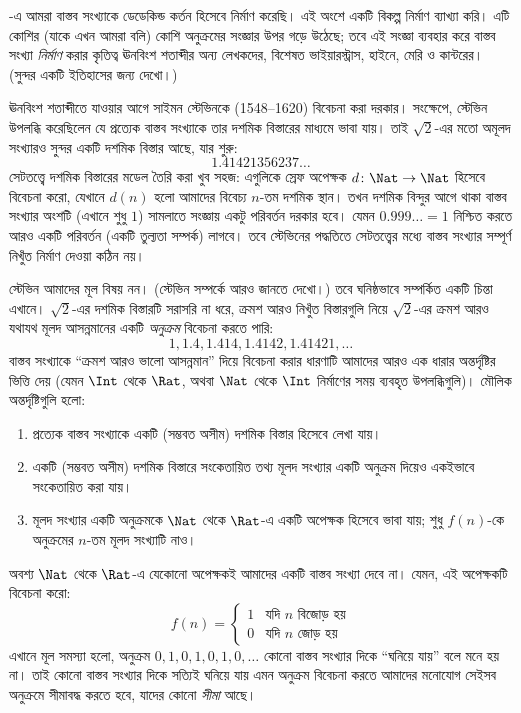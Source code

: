 \documentclass[../../../include/open-logic-section]{subfiles}
\begin{document}


-এ আমরা বাস্তব সংখ্যাকে ডেডেকিন্ড কর্তন হিসেবে নির্মাণ করেছি। এই অংশে একটি বিকল্প নির্মাণ ব্যাখ্যা করি। এটি কোশির (যাকে এখন আমরা বলি) কোশি অনুক্রমের সংজ্ঞার উপর গড়ে উঠেছে; তবে এই সংজ্ঞা ব্যবহার করে বাস্তব সংখ্যা \emph{নির্মাণ} করার কৃতিত্ব ঊনবিংশ শতাব্দীর অন্য লেখকদের, বিশেষত ভাইয়ারস্ট্রাস, হাইনে, মেরি ও কান্টরের। (সুন্দর একটি ইতিহাসের জন্য \citeauthor{OConnorRobertson:RN}
\citeyear{OConnorRobertson:RN} দেখো।)

ঊনবিংশ শতাব্দীতে যাওয়ার আগে সাইমন স্টেভিনকে (1548--1620) বিবেচনা করা দরকার। সংক্ষেপে, স্টেভিন উপলব্ধি করেছিলেন যে প্রত্যেক বাস্তব সংখ্যাকে তার দশমিক বিস্তারের মাধ্যমে ভাবা যায়। তাই $\sqrt{2}$-এর মতো অমূলদ সংখ্যারও সুন্দর একটি দশমিক বিস্তার আছে, যার শুরু:
\[
	1.41421356237\ldots
\]
সেটতত্ত্বে দশমিক বিস্তারের মডেল তৈরি করা খুব সহজ: এগুলিকে স্রেফ অপেক্ষক $d \colon \Nat \to \Nat$ হিসেবে বিবেচনা করো, যেখানে $d(n)$ হলো আমাদের বিবেচ্য $n$-তম দশমিক স্থান। তখন দশমিক বিন্দুর আগে থাকা বাস্তব সংখ্যার অংশটি (এখানে শুধু $1$) সামলাতে সংজ্ঞায় একটু পরিবর্তন দরকার হবে। যেমন $0.999\ldots
= 1$ নিশ্চিত করতে আরও একটি পরিবর্তন (একটি তুল্যতা সম্পর্ক) লাগবে। তবে স্টেভিনের পদ্ধতিতে সেটতত্ত্বের মধ্যে বাস্তব সংখ্যার সম্পূর্ণ নিখুঁত নির্মাণ দেওয়া কঠিন নয়।

স্টেভিন আমাদের মূল বিষয় নন। (স্টেভিন সম্পর্কে আরও জানতে \citealt{KatzKatz2012} দেখো।) তবে ঘনিষ্ঠভাবে সম্পর্কিত একটি চিন্তা এখানে। $\sqrt{2}$-এর দশমিক বিস্তারটি সরাসরি না ধরে, ক্রমশ আরও নিখুঁত বিস্তারগুলি নিয়ে $\sqrt{2}$-এর ক্রমশ আরও যথাযথ মূলদ আসন্নমানের একটি \emph{অনুক্রম} বিবেচনা করতে পারি:
\[
1, 1.4, 1.414, 1.4142, 1.41421,\ldots
\]
বাস্তব সংখ্যাকে ``ক্রমশ আরও ভালো আসন্নমান'' দিয়ে বিবেচনা করার ধারণাটি আমাদের আরও এক ধারার অন্তর্দৃষ্টির ভিত্তি দেয় (যেমন $\Int$ থেকে $\Rat$, অথবা $\Nat$ থেকে $\Int$ নির্মাণের সময় ব্যবহৃত উপলব্ধিগুলি)। মৌলিক অন্তর্দৃষ্টিগুলি হলো:
\begin{enumerate}
	\item প্রত্যেক বাস্তব সংখ্যাকে একটি (সম্ভবত অসীম) দশমিক বিস্তার হিসেবে লেখা যায়।
	\item একটি (সম্ভবত অসীম) দশমিক বিস্তারে সংকেতায়িত তথ্য মূলদ সংখ্যার একটি অনুক্রম দিয়েও একইভাবে সংকেতায়িত করা যায়।
	\item মূলদ সংখ্যার একটি অনুক্রমকে $\Nat$ থেকে $\Rat$-এ একটি অপেক্ষক হিসেবে ভাবা যায়; শুধু $f(n)$-কে অনুক্রমের $n$-তম মূলদ সংখ্যাটি নাও।
\end{enumerate}
অবশ্য $\Nat$ থেকে $\Rat$-এ যেকোনো অপেক্ষকই আমাদের একটি বাস্তব সংখ্যা দেবে না। যেমন, এই অপেক্ষকটি বিবেচনা করো:
\[
	f(n) =\begin{cases}
			1 & \text{যদি }n\text{ বিজোড় হয়}\\
			0 &\text{যদি }n\text{ জোড় হয়}
		\end{cases}
\]
এখানে মূল সমস্যা হলো, অনুক্রম $0,1,0,1,0,1,0,\ldots$ কোনো বাস্তব সংখ্যার দিকে ``ঘনিয়ে যায়'' বলে মনে হয় না। তাই কোনো বাস্তব সংখ্যার দিকে সত্যিই ঘনিয়ে যায় এমন অনুক্রম বিবেচনা করতে আমাদের মনোযোগ সেইসব অনুক্রমে সীমাবদ্ধ করতে হবে, যাদের কোনো \emph{সীমা} আছে।
\end{document}

